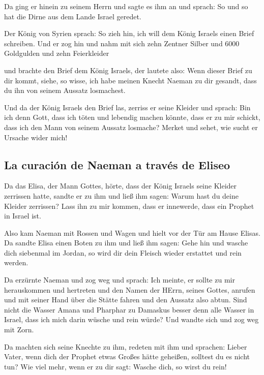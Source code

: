  Da ging er hinein zu seinem Herrn und sagte es ihm an und
sprach: So und so hat die Dirne aus dem Lande Israel geredet.

 Der König von Syrien sprach: So zieh hin, ich will dem
König Israels einen Brief schreiben. Und er zog hin und nahm mit sich
zehn Zentner Silber und 6000 Goldgulden und zehn Feierkleider

 und brachte den Brief dem König Israels, der lautete
also: Wenn dieser Brief zu dir kommt, siehe, so wisse, ich habe meinen
Knecht Naeman zu dir gesandt, dass du ihn von seinem Aussatz losmachest.

 Und da der König Israels den Brief las, zerriss er seine
Kleider und sprach: Bin ich denn Gott, dass ich töten und lebendig
machen könnte, dass er zu mir schickt, dass ich den Mann von seinem
Aussatz losmache? Merket und sehet, wie sucht er Ursache wider mich!

\hypertarget{la-curaciuxf3n-de-naeman-a-travuxe9s-de-eliseo}{%
\subsection{La curación de Naeman a través de
Eliseo}\label{la-curaciuxf3n-de-naeman-a-travuxe9s-de-eliseo}}

 Da das Elisa, der Mann Gottes, hörte, dass der König
Israels seine Kleider zerrissen hatte, sandte er zu ihm und ließ ihm
sagen: Warum hast du deine Kleider zerrissen? Lass ihn zu mir kommen,
dass er innewerde, dass ein Prophet in Israel ist.

 Also kam Naeman mit Rossen und Wagen und hielt vor der
Tür am Hause Elisas.  Da sandte Elisa einen Boten zu ihm
und ließ ihm sagen: Gehe hin und wasche dich siebenmal im Jordan, so
wird dir dein Fleisch wieder erstattet und rein werden.

 Da erzürnte Naeman und zog weg und sprach: Ich meinte,
er sollte zu mir herauskommen und hertreten und den Namen der HErrn,
seines Gottes, anrufen und mit seiner Hand über die Stätte fahren und
den Aussatz also abtun.  Sind nicht die Wasser Amana und
Pharphar zu Damaskus besser denn alle Wasser in Israel, dass ich mich
darin wüsche und rein würde? Und wandte sich und zog weg mit Zorn.

 Da machten sich seine Knechte zu ihm, redeten mit ihm
und sprachen: Lieber Vater, wenn dich der Prophet etwas Großes hätte
geheißen, solltest du es nicht tun? Wie viel mehr, wenn er zu dir sagt:
Wasche dich, so wirst du rein!

